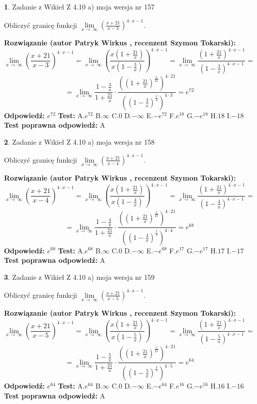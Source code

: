 \documentclass[12pt, a4paper]{article}
\theoremstyle{definition} %
\newtheorem{zad}{}
\newcommand{\zadStart}[1]{\begin{zad}#1\newline}
\newcommand{\zadStop}{\end{zad}}
\newcommand{\rozwStart}[2]{\noindent \textbf{Rozwiązanie (autor #1 , recenzent #2): }\newline}
\newcommand{\rozwStop}{\newline}
\newcommand{\odpStart}{\noindent \textbf{Odpowiedź:}\newline}
\newcommand{\odpStop}{\newline}
\newcommand{\testStart}{\noindent \textbf{Test:}\newline}
\newcommand{\testStop}{\newline}
\newcommand{\kluczStart}{\noindent \textbf{Test poprawna odpowiedź:}\newline}
\newcommand{\kluczStop}{\newline}
\begin{document}
\zadStart{Zadanie z Wikieł Z 4.10 a) moja wersja nr 157}

Obliczyć granicę funkcji  $\lim\limits_{x\to\ \infty}(\frac{x+21}{x-3})^{4\cdot x-1}$.
\zadStop
\rozwStart{Patryk Wirkus}{Szymon Tokarski}
$$\lim\limits_{x\to\ \infty}(\frac{x+21}{x-3})^{4\cdot x-1} = \lim\limits_{x\to\ \infty}(\frac{x(1+\frac{21}{x})}{x(1-\frac{3}{x})})^{4\cdot x-1}=\lim\limits_{x\to\ \infty}\frac{(1+\frac{21}{x})^{4\cdot x-1}}{(1-\frac{3}{x})^{4\cdot x-1}}=$$
$$=\lim\limits_{x\to\ \infty}\frac{1-\frac{3}{x}}{1+\frac{21}{x}}\cdot\frac{((1+\frac{21}{x})^{\frac{x}{21}})^{4\cdot21}}{((1-\frac{3}{x})^{\frac{x}{3}})^{4\cdot3}}=e^{72}$$
\rozwStop
\odpStart
$e^{72}$
\odpStop
\testStart
A.$e^{72}$ B.$\infty$ C.$0$ D.$-\infty$ E.$-e^{72}$
F.$e^{18}$ G.$-e^{18}$
H.$18$
I.$-18$
\testStop
\kluczStart
A
\kluczStop



\zadStart{Zadanie z Wikieł Z 4.10 a) moja wersja nr 158}

Obliczyć granicę funkcji  $\lim\limits_{x\to\ \infty}(\frac{x+21}{x-4})^{4\cdot x-1}$.
\zadStop
\rozwStart{Patryk Wirkus}{Szymon Tokarski}
$$\lim\limits_{x\to\ \infty}(\frac{x+21}{x-4})^{4\cdot x-1} = \lim\limits_{x\to\ \infty}(\frac{x(1+\frac{21}{x})}{x(1-\frac{4}{x})})^{4\cdot x-1}=\lim\limits_{x\to\ \infty}\frac{(1+\frac{21}{x})^{4\cdot x-1}}{(1-\frac{4}{x})^{4\cdot x-1}}=$$
$$=\lim\limits_{x\to\ \infty}\frac{1-\frac{4}{x}}{1+\frac{21}{x}}\cdot\frac{((1+\frac{21}{x})^{\frac{x}{21}})^{4\cdot21}}{((1-\frac{4}{x})^{\frac{x}{4}})^{4\cdot4}}=e^{68}$$
\rozwStop
\odpStart
$e^{68}$
\odpStop
\testStart
A.$e^{68}$ B.$\infty$ C.$0$ D.$-\infty$ E.$-e^{68}$
F.$e^{17}$ G.$-e^{17}$
H.$17$
I.$-17$
\testStop
\kluczStart
A
\kluczStop



\zadStart{Zadanie z Wikieł Z 4.10 a) moja wersja nr 159}

Obliczyć granicę funkcji  $\lim\limits_{x\to\ \infty}(\frac{x+21}{x-5})^{4\cdot x-1}$.
\zadStop
\rozwStart{Patryk Wirkus}{Szymon Tokarski}
$$\lim\limits_{x\to\ \infty}(\frac{x+21}{x-5})^{4\cdot x-1} = \lim\limits_{x\to\ \infty}(\frac{x(1+\frac{21}{x})}{x(1-\frac{5}{x})})^{4\cdot x-1}=\lim\limits_{x\to\ \infty}\frac{(1+\frac{21}{x})^{4\cdot x-1}}{(1-\frac{5}{x})^{4\cdot x-1}}=$$
$$=\lim\limits_{x\to\ \infty}\frac{1-\frac{5}{x}}{1+\frac{21}{x}}\cdot\frac{((1+\frac{21}{x})^{\frac{x}{21}})^{4\cdot21}}{((1-\frac{5}{x})^{\frac{x}{5}})^{4\cdot5}}=e^{64}$$
\rozwStop
\odpStart
$e^{64}$
\odpStop
\testStart
A.$e^{64}$ B.$\infty$ C.$0$ D.$-\infty$ E.$-e^{64}$
F.$e^{16}$ G.$-e^{16}$
H.$16$
I.$-16$
\testStop
\kluczStart
A
\kluczStop
\end{document}
